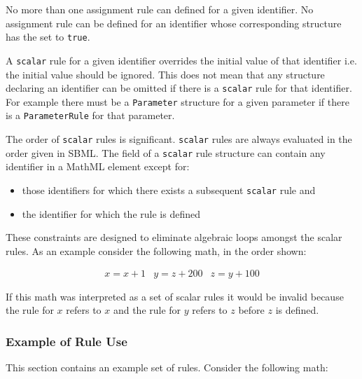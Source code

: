\documentclass[10pt]{cekarticle}
\begin{document}
No more than one assignment rule can defined for a given
identifier.  No assignment rule can be defined for an identifier
whose corresponding structure has the  set to
\texttt{true}.

A \texttt{scalar} rule for a given identifier overrides the
initial value of that identifier i.e. the initial value should be
ignored. This does not mean that any structure declaring an
identifier can be omitted if there is a \texttt{scalar} rule for
that identifier.  For example there must be a \texttt{Parameter}
structure for a given parameter if there is a
\texttt{ParameterRule} for that parameter.

The order of \texttt{scalar} rules is significant. \texttt{scalar}
rules are always evaluated in the order given in SBML.  The
 field of a \texttt{scalar} rule structure can
contain any identifier in a MathML  element except for:
\begin{itemize}

\item those identifiers for which there exists a subsequent
\texttt{scalar} rule and

\item the identifier for which the rule is defined

\end{itemize}
These constraints are designed to eliminate algebraic loops
amongst the scalar rules.  As an example consider the following math, in the order shown:

\begin{equation*}
  \begin{array}{lll}
    x = x + 1 & y = z + 200 & z = y + 100\\ \\[-4pt]
  \end{array}
\end{equation*}
If this math was interpreted as a set of scalar rules it would be invalid because the rule for $x$ refers to $x$ and the rule for $y$ refers to $z$ before $z$ is defined.

\subsubsection{Example of Rule Use}

This section contains an example set of rules.  Consider the 
following math:
\end{document}
